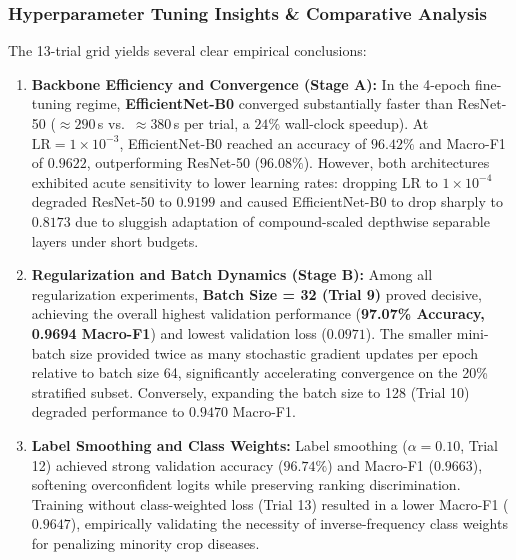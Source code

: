 \subsubsection{Hyperparameter Tuning Insights \& Comparative Analysis}
The 13-trial grid yields several clear empirical conclusions:
\begin{enumerate}[leftmargin=*]
    \item \textbf{Backbone Efficiency and Convergence (Stage A):} In the 4-epoch fine-tuning regime, \textbf{EfficientNet-B0} converged substantially faster than ResNet-50 ($\approx 290$\,s vs.\ $\approx 380$\,s per trial, a $24\%$ wall-clock speedup). At $\text{LR} = 1 \times 10^{-3}$, EfficientNet-B0 reached an accuracy of $96.42\%$ and Macro-F1 of $0.9622$, outperforming ResNet-50 ($96.08\%$). However, both architectures exhibited acute sensitivity to lower learning rates: dropping $\text{LR}$ to $1 \times 10^{-4}$ degraded ResNet-50 to $0.9199$ and caused EfficientNet-B0 to drop sharply to $0.8173$ due to sluggish adaptation of compound-scaled depthwise separable layers under short budgets.
    \item \textbf{Regularization and Batch Dynamics (Stage B):} Among all regularization experiments, \textbf{Batch Size = 32 (Trial 9)} proved decisive, achieving the overall highest validation performance (\textbf{97.07\% Accuracy, 0.9694 Macro-F1}) and lowest validation loss ($0.0971$). The smaller mini-batch size provided twice as many stochastic gradient updates per epoch relative to batch size 64, significantly accelerating convergence on the 20\% stratified subset. Conversely, expanding the batch size to 128 (Trial 10) degraded performance to $0.9470$ Macro-F1.
    \item \textbf{Label Smoothing and Class Weights:} Label smoothing ($\alpha = 0.10$, Trial 12) achieved strong validation accuracy ($96.74\%$) and Macro-F1 ($0.9663$), softening overconfident logits while preserving ranking discrimination. Training without class-weighted loss (Trial 13) resulted in a lower Macro-F1 ($0.9647$), empirically validating the necessity of inverse-frequency class weights for penalizing minority crop diseases.
\end{enumerate}


